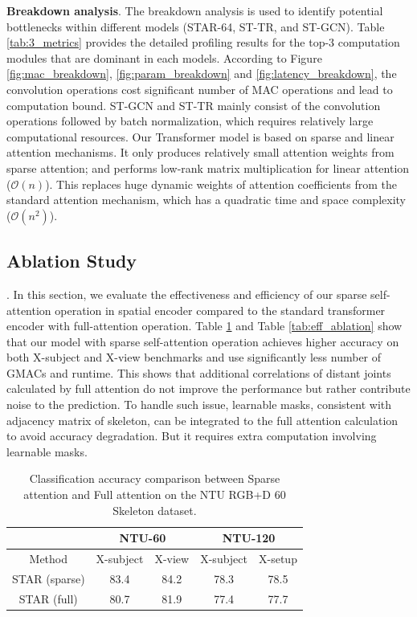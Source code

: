 \documentclass[letterpaper]{article} %
\begin{document}
\textbf{Breakdown analysis}.
The breakdown analysis is used to identify potential bottlenecks within different models (STAR-64, ST-TR, and ST-GCN). Table \ref{tab:3_metrics} provides the detailed profiling results for the top-3 computation modules that are dominant in each models. According to Figure \ref{fig:mac_breakdown}, \ref{fig:param_breakdown} and \ref{fig:latency_breakdown}, the convolution operations cost significant number of MAC operations and lead to computation bound. ST-GCN and ST-TR mainly consist of the convolution operations followed by batch normalization, which requires relatively large computational resources. Our Transformer model is based on sparse and linear attention mechanisms. It only produces relatively small attention weights from sparse attention; and performs low-rank matrix multiplication for linear attention ($\mathcal{O}(n)$). This replaces huge dynamic weights of attention coefficients from the standard attention mechanism, which has a quadratic time and space complexity ($\mathcal{O}(n^2)$). 

\subsection{Ablation Study}.
In this section, we evaluate the effectiveness and efficiency of our sparse self-attention operation in spatial encoder compared to the standard transformer encoder with full-attention operation. Table \ref{tab:acc_ablation} and Table \ref{tab:eff_ablation} show that our model with sparse self-attention operation achieves higher accuracy on both X-subject and X-view benchmarks and use significantly less number of GMACs and runtime. This shows that additional correlations of distant joints calculated by full attention do not improve the performance but rather contribute noise to the prediction. To handle such issue, learnable masks, consistent with adjacency matrix of skeleton, can be integrated to the full attention calculation to avoid accuracy degradation. But it requires extra computation involving learnable masks. 

\begin{table}[h!]
\centering
\begin{tabular}{ccccc}
       & \multicolumn{2}{c}{NTU-60}  & \multicolumn{2}{c}{NTU-120} \\ 
\toprule Method & X-subject & X-view & X-subject & X-setup \\ 
\hline
    STAR (sparse) & 83.4&84.2 & 78.3& 78.5 \\
    STAR (full) & 80.7&81.9 & 77.4& 77.7 \\
\hline
\end{tabular}
    \caption{Classification accuracy comparison between Sparse attention and Full attention on the NTU RGB+D 60 Skeleton dataset.}
\label{tab:acc_ablation}
\end{table}
\end{document}
